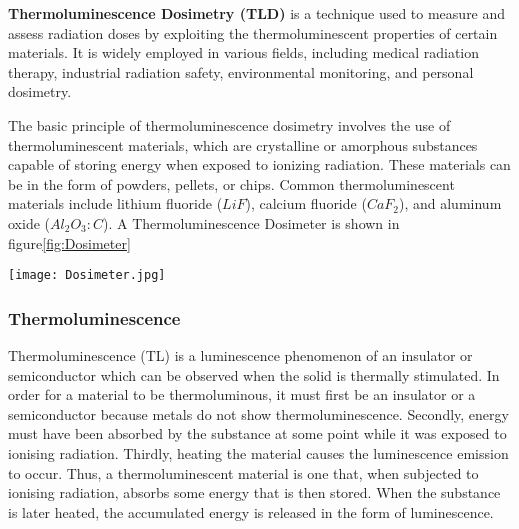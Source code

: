 \documentclass[../introduction.tex]{subfiles}
\begin{document}
    \textbf{Thermoluminescence Dosimetry (TLD)} is a technique used to measure and assess radiation doses by exploiting 
    the thermoluminescent properties of certain materials. It is widely employed in various fields, including medical 
    radiation therapy, industrial radiation safety, environmental monitoring, and personal dosimetry.

    The basic principle of thermoluminescence dosimetry involves the use of thermoluminescent materials, which are 
    crystalline or amorphous substances capable of storing energy when exposed to ionizing radiation. These materials 
    can be in the form of powders, pellets, or chips. Common thermoluminescent materials include lithium fluoride ($LiF$), 
    calcium fluoride ($CaF_2$), and aluminum oxide ($Al_2O_3:C$). A Thermoluminescence Dosimeter is shown in figure\ref{fig:Dosimeter}

    \begin{Figure}
        \centering
        \texttt{[image: Dosimeter.jpg]}
        \label{fig:Dosimeter}
    \end{Figure}

    \subsubsection*{\large Thermoluminescence}
        Thermoluminescence (TL) is a luminescence phenomenon\cite{a6} of an insulator or semiconductor which can be observed when
        the solid is thermally stimulated. In order for a material to be thermoluminous, it must first be an insulator 
        or a semiconductor because metals do not show thermoluminescence. Secondly, energy must have been absorbed by 
        the substance at some point while it was exposed to ionising radiation. Thirdly, heating the material causes the 
        luminescence emission to occur. Thus, a thermoluminescent material is one that, when subjected to ionising 
        radiation, absorbs some energy that is then stored. When the substance is later heated, the accumulated energy is 
        released in the form of luminescence.\cite{b1}
        
\end{document}
